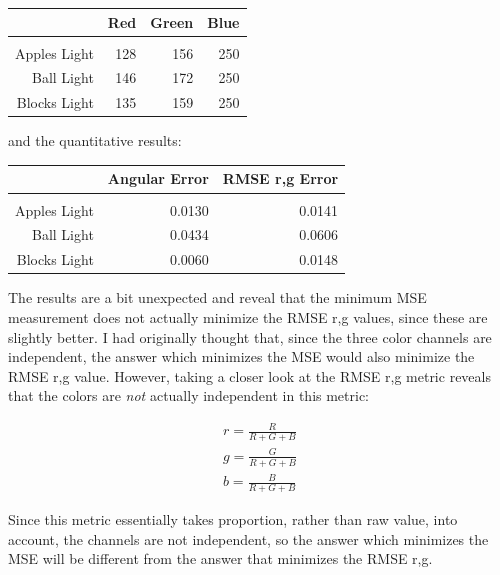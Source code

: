 \documentclass{article}
\begin{document}
\begin{tabular}{r | r r r}
                 & Red & Green & Blue \\
    \hline                            \\
    Apples Light & 128 &   156 &  250 \\
      Ball Light & 146 &   172 &  250 \\
    Blocks Light & 135 &   159 &  250
\end{tabular}

and the quantitative results:

\begin{tabular}{r | r r}
                 & Angular Error & RMSE r,g Error \\
    \hline                                        \\
    Apples Light &        0.0130 &         0.0141 \\
      Ball Light &        0.0434 &         0.0606 \\
    Blocks Light &        0.0060 &         0.0148
\end{tabular}

The results are a bit unexpected and reveal that the minimum MSE measurement 
does not actually minimize the RMSE r,g values, since these are slightly better. 
I had originally thought that, since the three color channels are independent, 
the answer which minimizes the MSE would also minimize the RMSE r,g value. 
However, taking a closer look at the RMSE r,g metric reveals that the colors are 
\textit{not} actually independent in this metric:

\begin{align*}
r = \frac{R}{R + G + B} \\
g = \frac{G}{R + G + B} \\
b = \frac{B}{R + G + B}
\end{align*}

Since this metric essentially takes proportion, rather than raw value, into 
account, the channels are not independent, so the answer which minimizes the MSE 
will be different from the answer that minimizes the RMSE r,g.
\end{document}
